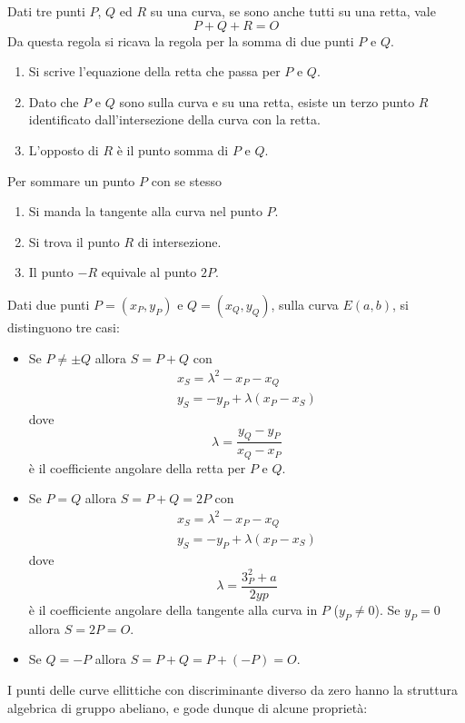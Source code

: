 Dati tre punti $P$, $Q$ ed $R$ su una curva, se sono anche tutti su una retta, vale
\[ P + Q + R = O \]
Da questa regola si ricava la regola per la somma di due punti $P$ e $Q$.
\begin{enumerate}
	\item Si scrive l'equazione della retta che passa per $P$ e $Q$.
	\item Dato che $P$ e $Q$ sono sulla curva e su una retta, esiste un terzo punto $R$ identificato dall'intersezione
	      della curva con la retta.
	\item L'opposto di $R$ \`e il punto somma di $P$ e $Q$.
\end{enumerate}
Per sommare un punto $P$ con se stesso
\begin{enumerate}
	\item Si manda la tangente alla curva nel punto $P$.
	\item Si trova il punto $R$ di intersezione.
	\item Il punto $-R$ equivale al punto $2P$.
\end{enumerate}
Dati due punti $P = (x_P, y_P)$ e $Q = (x_Q, y_Q)$, sulla curva $E(a, b)$, si distinguono tre casi:
\begin{itemize}
	\item Se $P \neq \pm Q$ allora $S = P + Q$ con
	      \[ \begin{matrix}
			      x_S = \lambda^2 - x_P - x_Q \\
			      y_S = -y_P + \lambda (x_P - x_S)
		      \end{matrix}
	      \]
	      dove
	      \[ \lambda = \frac{y_Q - y_P}{x_Q - x_P} \]
	      \`e il coefficiente angolare della retta per $P$ e $Q$.
	\item Se $P = Q$ allora $S = P + Q = 2P$ con
	      \[
		      \begin{matrix}
			      x_S = \lambda^2 - x_P - x_Q \\
			      y_S = -y_P + \lambda (x_P - x_S)
		      \end{matrix}
	      \]
	      dove
	      \[ \lambda = \frac{3_P^2 + a}{2yp} \]
	      \`e il coefficiente angolare della tangente alla curva in $P$ ($y_P \neq 0$).
	      Se $y_P = 0$ allora $S = 2P = O$.
	\item Se $Q = -P$ allora $S = P + Q = P + (-P) = O$.
\end{itemize}
I punti delle curve ellittiche con discriminante diverso da zero hanno la struttura algebrica di gruppo abeliano,
e gode dunque di alcune propriet\`a:
